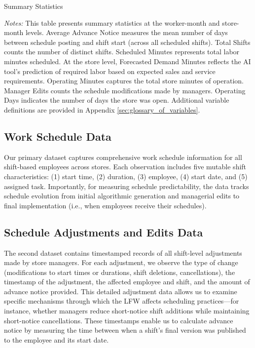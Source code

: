 \documentclass[letterpaper,11pt,leqno]{article}
\theoremstyle{paper}
\newcommand{\note}[2][]{\parbox{\textwidth}{\footnotesize\vspace*{10pt}\textit{#1}#2}}
\begin{document}
\begin{singlespace}
\begin{table}[h]
\caption{Summary Statistics}

\note{\textit{Notes:} \scriptsize This table presents summary statistics at the worker-month and store-month levels. Average Advance Notice measures the mean number of days between schedule posting and shift start (across all scheduled shifts). Total Shifts counts the number of distinct shifts. Scheduled Minutes represents total labor minutes scheduled. At the store level, Forecasted Demand Minutes reflects the AI tool's prediction of required labor based on expected sales and service requirements. Operating Minutes captures the total store minutes of operation. Manager Edits counts the schedule modifications made by managers. Operating Days indicates the number of days the store was open. Additional variable definitions are provided in Appendix \ref{sec:glossary_of_variables}.}
\label{table:sum_stats_all}
\end{table}
\end{singlespace}


\subsection{Work Schedule Data} \label{subsec:data_versions}
Our primary dataset captures comprehensive work schedule information for all shift-based employees across stores. Each observation includes five mutable shift characteristics: (1) start time, (2) duration, (3) employee, (4) start date, and (5) assigned task. Importantly, for measuring schedule predictability, the data tracks schedule evolution from initial algorithmic generation and managerial edits to final implementation (i.e., when employees receive their schedules). 

\subsection{Schedule Adjustments and Edits Data} \label{subsec:data_adjustments}
The second dataset contains timestamped records of all shift-level adjustments made by store managers. For each adjustment, we observe the type of change (modifications to start times or durations, shift deletions, cancellations), the timestamp of the adjustment, the affected employee and shift, and the amount of advance notice provided. This detailed adjustment data allows us to examine specific mechanisms through which the LFW affects scheduling practices—for instance, whether managers reduce short-notice shift additions while maintaining short-notice cancellations. These timestamps enable us to calculate advance notice by measuring the time between when a shift's final version was published to the employee and its start date.
\end{document}
